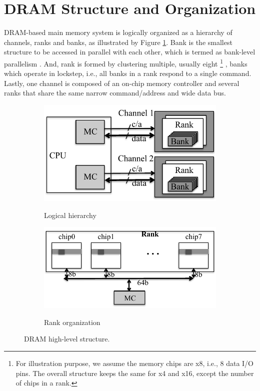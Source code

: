 \section{DRAM Structure and Organization}
DRAM-based main memory system is logically organized as a hierarchy of channels, ranks and banks, as illustrated by Figure \ref{fig:dram_org}.
Bank is the smallest structure to be accessed in parallel with each other, which is termed as bank-level parallelism \cite{ISCA08:blp, MICRO09:blp}.
And, rank is formed by clustering multiple, usually eight
\footnote{For illustration purpose, we assume the memory chips are x8, i.e., 8 data I/O pins. The overall structure keeps the same for x4 and x16, except the number of chips in a rank.}
, banks which operate in lockstep, i.e., all banks in a rank respond to a single command. 
Lastly, one channel is composed of an on-chip memory controller and several ranks that share the same narrow command/address and wide data bus.

\begin{figure}
 \centering
  \begin{subfigure}{.34\textwidth}
    \centering
    	\includegraphics[width=\linewidth]{figures/dram_org.pdf}\\
    \caption{Logical hierarchy}
    \label{fig:dram_org}
  \end{subfigure}
%
  \begin{subfigure}{.39\textwidth}
    \centering
    	\includegraphics[width=\linewidth]{figures/dram_rank.pdf}\\
    \caption{Rank organization}
    \label{fig:dram_rank}
  \end{subfigure}
  \vspace{-0.45in}
  \caption{DRAM high-level structure.}
  \label{fig:dram}
\end{figure}

